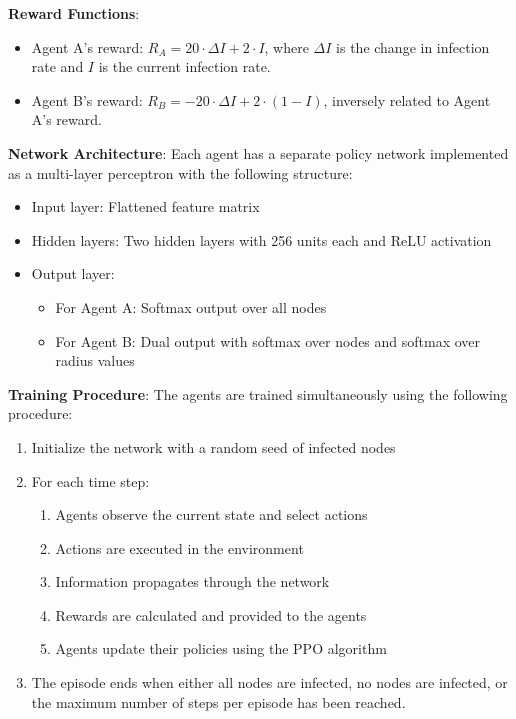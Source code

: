 \documentclass[12pt]{article}
\begin{document}
\textbf{Reward Functions}:
\begin{itemize}
    \item Agent A's reward: $R_A = 20 \cdot \Delta I + 2 \cdot I$, where $\Delta I$ is the change in infection rate and $I$ is the current infection rate.
    \item Agent B's reward: $R_B = -20 \cdot \Delta I + 2 \cdot (1 - I)$, inversely related to Agent A's reward.
\end{itemize}

\textbf{Network Architecture}: Each agent has a separate policy network implemented as a multi-layer perceptron with the following structure:
\begin{itemize}
    \item Input layer: Flattened feature matrix
    \item Hidden layers: Two hidden layers with 256 units each and ReLU activation
    \item Output layer: 
    \begin{itemize}
        \item For Agent A: Softmax output over all nodes
        \item For Agent B: Dual output with softmax over nodes and softmax over radius values
    \end{itemize}
\end{itemize}

\textbf{Training Procedure}: The agents are trained simultaneously using the following procedure:
\begin{enumerate}
    \item Initialize the network with a random seed of infected nodes
    \item For each time step:
    \begin{enumerate}
        \item Agents observe the current state and select actions
        \item Actions are executed in the environment
        \item Information propagates through the network
        \item Rewards are calculated and provided to the agents
        \item Agents update their policies using the PPO algorithm
    \end{enumerate}
    \item The episode ends when either all nodes are infected, no nodes are infected, or the maximum 
    number of steps per episode has been reached. 
\end{enumerate}
\end{document}
